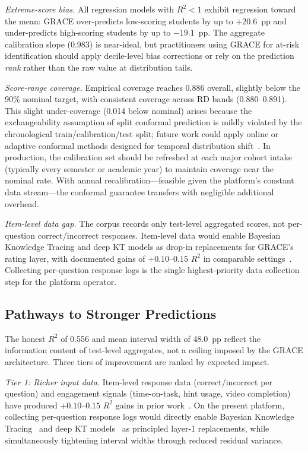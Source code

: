 \documentclass[11pt]{article}
\begin{document}
\textit{Extreme-score bias.}\quad
All regression models with $R^{2} < 1$ exhibit regression toward the mean: GRACE
over-predicts low-scoring students by up to $+20.6$~pp and under-predicts
high-scoring students by up to $-19.1$~pp.
The aggregate calibration slope (0.983) is near-ideal, but practitioners using
GRACE for at-risk identification should apply decile-level bias corrections or rely
on the prediction \textit{rank} rather than the raw value at distribution tails.

\textit{Score-range coverage.}\quad
Empirical coverage reaches 0.886 overall, slightly below the 90\% nominal target, with
consistent coverage across RD bands (0.880--0.891).
This slight under-coverage (0.014 below nominal) arises because the exchangeability
assumption of split conformal prediction is mildly violated by the chronological
train/calibration/test split; future work could apply online or adaptive conformal methods
designed for temporal distribution shift~\cite{gibbs2021,zaffran2022}.
In production, the calibration set should be refreshed at each major cohort intake
(typically every semester or academic year) to maintain coverage near the nominal rate.
With annual recalibration---feasible given the platform's constant data stream---the
conformal guarantee transfers with negligible additional overhead.

\textit{Item-level data gap.}\quad
The corpus records only test-level aggregated scores, not per-question
correct/incorrect responses.
Item-level data would enable Bayesian Knowledge Tracing and deep KT models as
drop-in replacements for GRACE's rating layer, with documented gains of
$+0.10$--$0.15$ $R^{2}$ in comparable settings~\cite{romero2020,hellas2018}.
Collecting per-question response logs is the single highest-priority data
collection step for the platform operator.

\subsection{Pathways to Stronger Predictions}

The honest $R^{2}$ of 0.556 and mean interval width of 48.0~pp reflect the information
content of test-level aggregates, not a ceiling imposed by the GRACE architecture.
Three tiers of improvement are ranked by expected impact.

\textit{Tier 1: Richer input data.}\quad
Item-level response data (correct/incorrect per question) and engagement signals
(time-on-task, hint usage, video completion) have produced $+0.10$--$0.15$ $R^{2}$
gains in prior work~\cite{romero2020,hellas2018}.
On the present platform, collecting per-question response logs would directly enable
Bayesian Knowledge Tracing~\cite{corbett1994} and deep KT
models~\cite{shin2021,ghosh2020,liu2023simplekt} as principled layer-1 replacements,
while simultaneously tightening interval widths through reduced residual variance.
\end{document}
